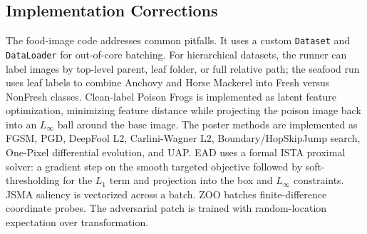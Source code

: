 \documentclass[conference]{IEEEtran}
\begin{document}
\subsection{Implementation Corrections}

The food-image code addresses common pitfalls. It uses a custom \texttt{Dataset} and \texttt{DataLoader} for out-of-core batching. For hierarchical datasets, the runner can label images by top-level parent, leaf folder, or full relative path; the seafood run uses leaf labels to combine Anchovy and Horse Mackerel into Fresh versus NonFresh classes. Clean-label Poison Frogs is implemented as latent feature optimization, minimizing feature distance while projecting the poison image back into an \(L_\infty\) ball around the base image. The poster methods are implemented as FGSM, PGD, DeepFool L2, Carlini-Wagner L2, Boundary/HopSkipJump search, One-Pixel differential evolution, and UAP. EAD uses a formal ISTA proximal solver: a gradient step on the smooth targeted objective followed by soft-thresholding for the \(L_1\) term and projection into the box and \(L_\infty\) constraints. JSMA saliency is vectorized across a batch. ZOO batches finite-difference coordinate probes. The adversarial patch is trained with random-location expectation over transformation.
\end{document}
